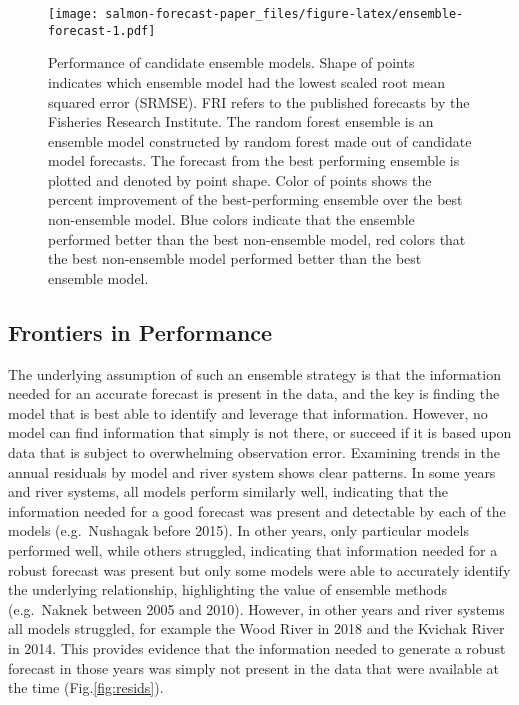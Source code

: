 \documentclass[
]{article}
\begin{document}
\begin{figure}
\centering
\texttt{[image: salmon-forecast-paper\_files/figure-latex/ensemble-forecast-1.pdf]}
\caption{\label{fig:ensemble-forecast}Performance of candidate ensemble models. Shape of points indicates which ensemble model had the lowest scaled root mean squared error (SRMSE). FRI refers to the published forecasts by the Fisheries Research Institute. The random forest ensemble is an ensemble model constructed by random forest made out of candidate model forecasts. The forecast from the best performing ensemble is plotted and denoted by point shape. Color of points shows the percent improvement of the best-performing ensemble over the best non-ensemble model. Blue colors indicate that the ensemble performed better than the best non-ensemble model, red colors that the best non-ensemble model performed better than the best ensemble model.}
\end{figure}

\hypertarget{frontiers-in-performance}{%
\subsection*{Frontiers in Performance}\label{frontiers-in-performance}}

The underlying assumption of such an ensemble strategy is that the information needed for an accurate forecast is present in the data, and the key is finding the model that is best able to identify and leverage that information. However, no model can find information that simply is not there, or succeed if it is based upon data that is subject to overwhelming observation error. Examining trends in the annual residuals by model and river system shows clear patterns. In some years and river systems, all models perform similarly well, indicating that the information needed for a good forecast was present and detectable by each of the models (e.g.~Nushagak before 2015). In other years, only particular models performed well, while others struggled, indicating that information needed for a robust forecast was present but only some models were able to accurately identify the underlying relationship, highlighting the value of ensemble methods (e.g.~Naknek between 2005 and 2010). However, in other years and river systems all models struggled, for example the Wood River in 2018 and the Kvichak River in 2014. This provides evidence that the information needed to generate a robust forecast in those years was simply not present in the data that were available at the time (Fig.\ref{fig:resids}).
\end{document}
